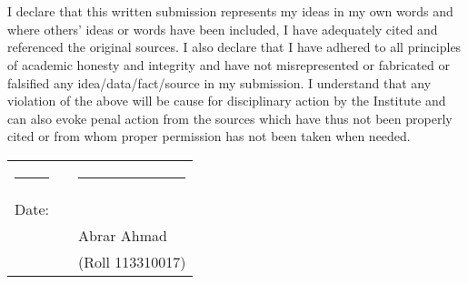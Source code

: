\chapter*{}

I declare that this written submission represents my ideas in my own words
and where others' ideas or words have been included, I have adequately cited
and referenced the original sources. I also declare that I have adhered to all
principles of academic honesty and integrity and have not misrepresented or
fabricated or falsified any idea/data/fact/source in my submission. I
understand that any violation of the above will be cause for disciplinary
action by the Institute and can also evoke penal action from the sources which
have thus not been properly cited or from whom proper permission has not been
taken when needed.

\vspace{1.5cm}

\begin{tabular}{lll}
\rule{30mm}{0pt}        & \rule{60mm}{0pt}       & \rule{60mm}{0pt} \\
Date:\dotfill           &                        & \dotfill \\
                        &                        & Abrar Ahmad \\
                        &                        & (Roll 113310017)\\
\end{tabular}
